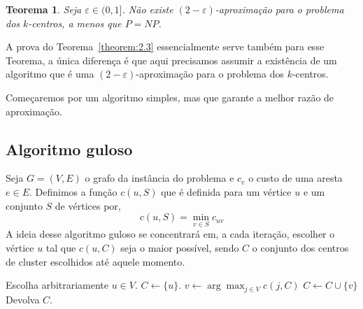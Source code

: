 \documentclass[12pt]{article}
\newtheorem{theorem}{Teorema}[section]
\newcommand{\NP}{\mathit{NP}}
\begin{document}
    \begin{theorem}
        Seja $\varepsilon \in (0,1]$. Não existe $(2-\varepsilon)$-aproximação para o problema dos $k$-centros, a menos que $P=\NP$.
    \end{theorem}
    A prova do Teorema~\ref{theorem:2.3} essencialmente serve também para esse Teorema, a única diferença é que aqui precisamos assumir a existência de um algoritmo que é uma $(2 - \varepsilon)$-aproximação para o problema dos $k$-centros.

    Começaremos por um algoritmo simples, mas que garante a melhor razão de aproximação.
    
\newpage
\subsection{Algoritmo guloso}
    Seja $G = (V,E)$ o grafo da instância do problema e $c_e$ o custo de uma aresta $e \in E$.
    Definimos a função $c(u,S)$ que é definida para um vértice $u$ e um conjunto $S$ de vértices  por,
    \[ c(u,S) = \min_{v\in S} c_{uv}
        \]
    A ideia desse algoritmo guloso se concentrará em, a cada iteração, escolher o vértice $u$ tal que $c(u,C)$ seja o maior possível, sendo $C$ o conjunto dos centros de cluster escolhidos até aquele momento.

    \begin{algorithm}
		\begin{algorithmic}[1]
			\State Escolha arbitrariamente $u \in V$.
            \State $C \gets \{u\}$.
            \State $v \gets \arg\max_{j \in V} c(j,C)$
            \State $C \gets C \cup \{v\}$
            \EndWhile 
			\State Devolva $C$.
			\EndFunction
		\end{algorithmic}
	\end{algorithm}
    
\end{document}
